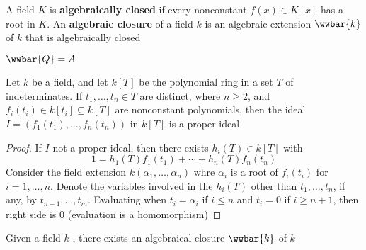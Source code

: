 \documentclass[11pt]{article}
\begin{document}
\begin{definition}[]
A field \(K\) is \textbf{algebraically closed} if every nonconstant \(f(x)\in K[x]\) has
a root in \(K\). An \textbf{algebraic closure} of a field \(k\) is an algebraic extension
\(\wwbar{k}\) of \(k\) that is algebraically closed
\end{definition}

\(\wwbar{\Q}=\A\)

\begin{lemma}[]
\label{nlemma5.56}
Let \(k\) be a field, and let \(k[T]\) be the polynomial ring in a set \(T\) of
indeterminates. If \(t_1,\dots,t_n\in T\) are distinct, where \(n\ge2\), and 
\(f_i(t_i)\in k[t_i]\subseteq k[T]\) are nonconstant polynomials, then the
ideal \(I=(f_1(t_1),\dots,f_n(t_n))\) in \(k[T]\) is a proper ideal
\end{lemma}

\begin{proof}
If \(I\) not a proper ideal, then there exists \(h_i(T)\in k[T]\) with
\begin{equation*}
1=h_1(T)f_1(t_1)+\cdots+h_n(T)f_n(t_n)
\end{equation*}
Consider the field extension \(k(\alpha_1,\dots,\alpha_n)\) whre \(\alpha_i\)
is a root of \(f_i(t_i)\) for \(i=1,\dots,n\). Denote the variables involved
in the \(h_i(T)\) other than \(t_1,\dots,t_n\), if any, by
\(t_{n+1},\dots,t_m\). Evaluating when \(t_i=\alpha_i\) if \(i\le n\) and
\(t_i=0\) if \(i\ge n+1\), then right side is 0 (evaluation is a homomorphism)
\end{proof}

\begin{theorem}[]
Given a field \(k\) , there exists an algebraical closure \(\wwbar{k}\) of \(k\)
\end{theorem}
\end{document}
